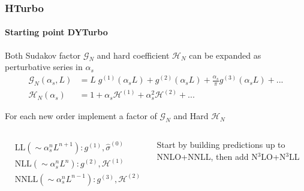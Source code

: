 \documentclass[aspectratio=43]{beamer}
\begin{document}
\begin{frame}

	\frametitle{HTurbo}
	\framesubtitle{Starting point DYTurbo}

	Both Sudakov factor $\mathcal{G}_{N}$ and hard coefficient $\mathcal{H}_{N}$ can be expanded as perturbative series in $\alpha_{s}$
	\begin{align}
		\mathcal{G}_{N}(\alpha_{s}, L) &= L\;g^{(1)}(\alpha_{s}L) + g^{(2)}(\alpha_{s}L) + \frac{\alpha_{s}}{\pi}g^{(3)}(\alpha_{s}L) + ... \nonumber \\
		\mathcal{H}_{N}(\alpha_{s}) &= 1 + \alpha_{s}\mathcal{H}^{(1)} + \alpha_{s}^{2}\mathcal{H}^{(2)} + ...  \nonumber
	\end{align}
	
	For each new order implement a factor of $\mathcal{G}_{N}$ and Hard $\mathcal{H}_{N}$
	
	\begin{columns}
		

		\begin{align}
			&\textrm{LL} (\sim \alpha_{s}^{n}L^{n+1}): g^{(1)}, \hat{\sigma}^{(0)} \nonumber \\
			&\textrm{NLL} (\sim \alpha_{s}^{n}L^{n}): g^{(2)}, \mathcal{H}^{(1)} \nonumber \\
			&\textrm{NNLL} (\sim \alpha_{s}^{n}L^{n-1}): g^{(3)}, \mathcal{H}^{(2)} \nonumber
		\end{align}
	
		
		Start by building predictions up to NNLO+NNLL, then add {\color{blue}N$^{3}$LO+N$^{3}$LL}
		
	\end{columns}

\end{frame}
\end{document}
